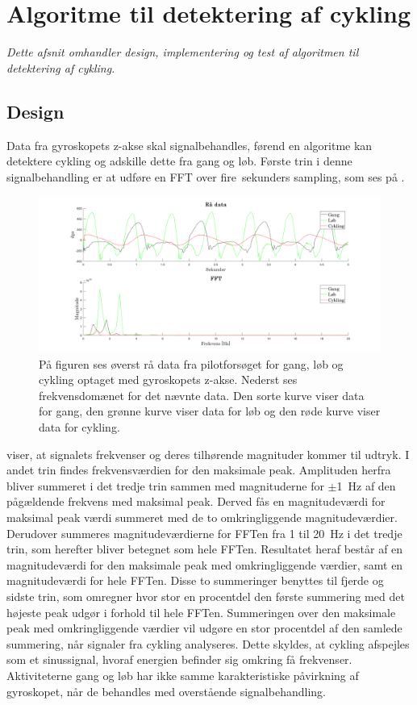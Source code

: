 \section{Algoritme til detektering af cykling}\label{sec:algocykel}
\textit{Dette afsnit omhandler design, implementering og test af algoritmen til detektering af cykling.}  

\subsection{Design}\label{design_cykling}
Data fra gyroskopets z-akse skal signalbehandles, førend en algoritme kan detektere cykling og adskille dette fra gang og løb. Første trin i denne signalbehandling er at udføre en FFT over fire~sekunders sampling, som ses på .
\begin{figure}[H]
	\centering
	\includegraphics[scale=0.3]{figures/cDesign/gyro_behandling.png}
	\caption{På figuren ses øverst rå data fra pilotforsøget for gang, løb og cykling optaget med gyroskopets z-akse. Nederst ses frekvensdomænet for det nævnte data. Den sorte kurve viser data for gang, den grønne kurve viser data for løb og den røde kurve viser data for cykling.}
	\label{fig:gyro_behandling}
\end{figure}\vspace{-0.25cm}
 viser, at signalets frekvenser og deres tilhørende magnituder kommer til udtryk. I andet trin findes frekvensværdien for den maksimale peak. Amplituden herfra bliver summeret i det tredje trin sammen med magnituderne for $\pm$1~Hz af den pågældende frekvens med maksimal peak. Derved fås en magnitudeværdi for maksimal peak værdi summeret med de to omkringliggende magnitudeværdier. Derudover summeres magnitudeværdierne for FFTen fra 1 til 20~Hz i det tredje trin, som herefter bliver betegnet som hele FFTen. Resultatet heraf består af en magnitudeværdi for den maksimale peak med omkringliggende værdier, samt en magnitudeværdi for hele FFTen. Disse to summeringer benyttes til fjerde og sidste trin, som omregner hvor stor en procentdel den første summering med det højeste peak udgør i forhold til hele FFTen. Summeringen over den maksimale peak med omkringliggende værdier vil udgøre en stor procentdel af den samlede summering, når signaler fra cykling analyseres. Dette skyldes, at cykling afspejles som et sinussignal, hvoraf energien befinder sig omkring få frekvenser. Aktiviteterne gang og løb har ikke samme karakteristiske påvirkning af gyroskopet, når de behandles med overstående signalbehandling.

